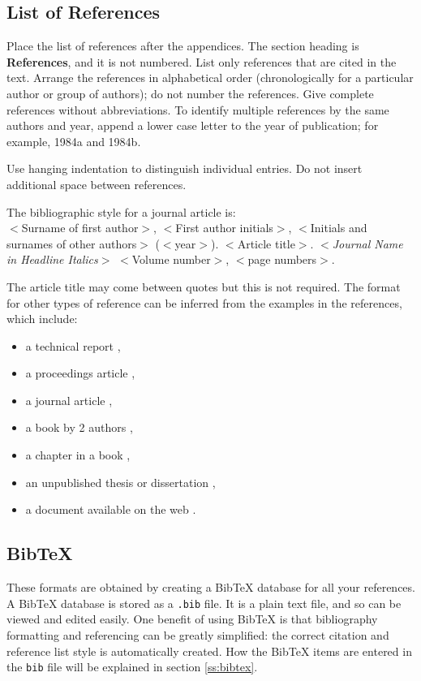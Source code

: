 \documentclass[a4paper,11pt]{article}
\theoremstyle{plain}
\theoremstyle{definition}
\begin{document}
\subsection{List of References}
Place the list of references after the appendices.
The section heading is \textbf{References}, and it is not numbered.
List only references that are cited in the text.
Arrange the references in alphabetical order (chronologically for a
particular author or group of authors); do not number the references.
Give complete references without abbreviations.
To identify multiple references by the same authors and year, append a
lower case letter to the year of publication; for example, 1984a and 1984b.

Use hanging indentation to distinguish individual entries.
Do not insert additional space between references.

The bibliographic style for a journal article is: \\
$<$Surname of first author$>$, $<$First author initials$>$,
$<$Initials and surnames of other authors$>$ ($<$year$>$).
$<$Article title$>$. $<${\em Journal Name in
Headline Italics}$>$ $<$Volume number$>$, $<$page numbers$>$.

The article title may come between quotes but this is not required.
The format for other types of reference can be inferred from the
examples in the references, which include:
\begin{itemize}
\setlength\itemsep{-1mm}
\item a technical report \citep{chi89},
\item a proceedings article \citep{evkekro07},
\item a journal article \citep{alon},
\item a book by 2 authors \citep{asmus07},
\item a chapter in a book \citep{asrub1},
\item an unpublished thesis or dissertation \citep{garvels00},
\item a document available on the web \citep{sudoku}.
\end{itemize}

\subsection{BibTeX}
These formats are obtained by creating a BibTeX database for all your references.
A BibTeX database is stored as a \texttt{.bib} file.
It is a plain text file, and so can be viewed and edited easily.
One benefit of using BibTeX is that bibliography formatting and
referencing can be greatly simplified: the correct citation and
reference list style is automatically created.
How the BibTeX items are entered in the \texttt{bib} file will be
explained in section \ref{ss:bibtex}.
\end{document}
